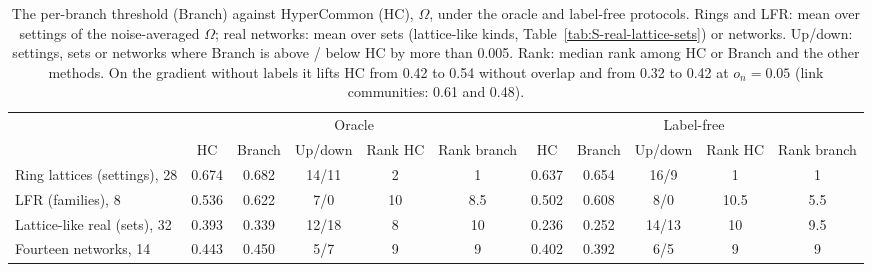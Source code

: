 \begin{table}[h]
\caption{The per-branch threshold (Branch) against HyperCommon (HC), $\Omega$, under the oracle and label-free protocols. Rings and LFR: mean over settings of the noise-averaged $\Omega$; real networks: mean over sets (lattice-like kinds, Table~\ref{tab:S-real-lattice-sets}) or networks. Up/down: settings, sets or networks where Branch is above / below HC by more than 0.005. Rank: median rank among HC or Branch and the other methods. On the gradient without labels it lifts HC from 0.42 to 0.54 without overlap and from 0.32 to 0.42 at $o_n=0.05$ (link communities: 0.61 and 0.48).}
\label{tab:S-tree}
\begin{ruledtabular}
\begin{tabular}{lccccc|ccccc}
 & \multicolumn{5}{c}{Oracle} & \multicolumn{5}{c}{Label-free} \\
 & HC & Branch & Up/down & Rank HC & Rank branch & HC & Branch & Up/down & Rank HC & Rank branch \\
\hline
Ring lattices (settings), 28 & 0.674 & 0.682 & 14/11 & 2 & 1 & 0.637 & 0.654 & 16/9 & 1 & 1 \\
LFR (families), 8 & 0.536 & 0.622 & 7/0 & 10 & 8.5 & 0.502 & 0.608 & 8/0 & 10.5 & 5.5 \\
Lattice-like real (sets), 32 & 0.393 & 0.339 & 12/18 & 8 & 10 & 0.236 & 0.252 & 14/13 & 10 & 9.5 \\
Fourteen networks, 14 & 0.443 & 0.450 & 5/7 & 9 & 9 & 0.402 & 0.392 & 6/5 & 9 & 9 \\
\end{tabular}
\end{ruledtabular}
\end{table}
